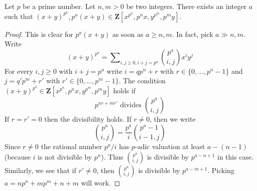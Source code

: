 \begin{lemma}
\label{lemma-help-with-powers}
Let $p$ be a prime number. Let $n, m > 0$ be two integers. There exists
an integer $a$ such that
$(x + y)^{p^a}, p^a(x + y) \in \mathbf{Z}[x^{p^n}, p^nx, y^{p^m}, p^my]$.
\end{lemma}

\begin{proof}
This is clear for $p^a(x + y)$ as soon as $a \geq n, m$.
In fact, pick $a \gg n, m$. Write
$$
(x + y)^{p^a}  = \sum\nolimits_{i, j \geq 0, i + j = p^a}
{p^a \choose i, j} x^iy^j
$$
For every $i, j \geq 0$ with $i + j = p^a$ write
$i = q p^n + r$ with $r \in \{0, \ldots, p^n - 1\}$ and
$j = q' p^m + r'$ with $r' \in \{0, \ldots, p^m - 1\}$.
The condition $(x + y)^{p^a} \in \mathbf{Z}[x^{p^n}, p^nx, y^{p^m}, p^my]$
holds if
$$
p^{nr + mr'} \text{ divides } {p^a \choose i, j}
$$
If $r = r' = 0$ then the divisibility holds. If $r \not = 0$, then
we write
$$
{p^a \choose i, j} = \frac{p^a}{i} {p^a - 1 \choose i - 1, j}
$$
Since $r \not = 0$ the rational number $p^a/i$ has $p$-adic
valuation at least $a - (n - 1)$ (because $i$ is not divisible by $p^n$).
Thus ${p^a \choose i, j}$ is divisible by $p^{a - n + 1}$ in this case.
Similarly, we see that if $r' \not = 0$, then ${p^a \choose i, j}$ is
divisible by $p^{a - m + 1}$. Picking $a = np^n + mp^m + n + m$ will work.
\end{proof}